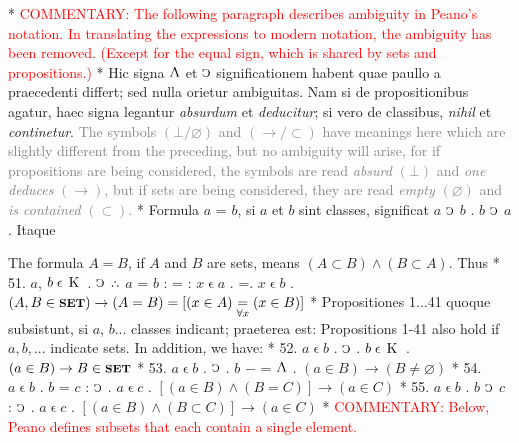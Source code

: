 \documentclass{book}
\newcommand{\C}{\mathop{\sbox0{$\displaystyle$$\reflectbox{C}$} %
\raisebox{-\height+\ht0-0.05cm}[\ht0][\dp0]{\scalebox{0.8}[0.8]{\copy0}}}\displaylimits} %
\newcommand{\pppNoSpace}{\leavevmode\lower0ex\hbox{.}\kern-0.1em\raise0.7ex\hbox{.}\kern-0.1em\lower0ex\hbox{.}} %
\newcommand{\abs}{\mathop{\rotatebox[origin=c]{180}{V}}}
\newcommand{\smallIn}{\ensuremath{\mathrel{\epsilon}}}
\newcommand{\K}{\mathop{\thinspace \text{K} \thinspace}}
\newcommand{\setOfSets}{\mathord{\text{{\footnotesize \textbf{SET}}}}}
\newcommand\irrelavent[1]{\textcolor{gray}{#1}}
\newcommand\commentary[1]{\textcolor{red}{COMMENTARY: #1}}
\newenvironment{translateTwoCol}
               { %
                 \columnratio{0.5, 0.5}
                 \begin{paracol}{2}
                 \newcommand{\LAT}{\switchcolumn[0]*}
                 \newcommand{\ENG}{\switchcolumn[1]}
               }
               { %
                 \let\ENG\undefined
                 \let\LAT\undefined
                 \end{paracol}
               }
\begin{document}
\begin{translateTwoCol}
\LAT
\ENG
\commentary{The following paragraph describes ambiguity in Peano's notation.  In translating the expressions to modern notation, the ambiguity has been removed.  (Except for the equal sign, which is shared by sets and propositions.) }
\LAT
Hic signa $\abs$ et $\C$ significationem habent quae paullo a praecedenti differt; sed nulla orietur ambiguitas. Nam si de propositionibus agatur, haec signa legantur \emph{absurdum} et \emph{deducitur}; si vero de classibus, \emph{nihil} et \emph{continetur}.
\ENG
\irrelavent{The symbols $(\bot / \varnothing)$ and $(\rightarrow / \subset)$ have meanings here which are slightly different from the preceding, but no ambiguity will arise, for if propositions are being considered, the symbols are read \emph{absurd} $(\bot)$ and \emph{one deduces} $(\rightarrow)$, but if sets are being considered, they are read \emph{empty} $(\varnothing)$ and \emph{is contained} $(\subset)$.}
\LAT
\quad Formula $a$ = $b$, si $a$ et $b$ sint classes, significat $a$ $\C$ $b$ . $b$ $\C$ $a$. Itaque
\ENG
\raggedright
\quad The formula $A = B$, if $A$ and $B$ are sets, means $(A \subset B) \wedge (B \subset A)$. Thus
\LAT
51. \hspace{0.67cm} $a$, $b \smallIn \K$ . $\C$ $\pppNoSpace$ $a$ = $b$ : = : $x \smallIn a$ . =\scalebox{0.7}{$x$}\thinspace . $x \smallIn b$
\ENG
51. \hspace{0.67cm} $(A, B \in \setOfSets) \rightarrow (A = B) = [(x \in A) \underset{\forall x}=  (x \in B)]$
\LAT
Propositiones 1...41 quoque subsistunt, si $a$, $b$... classes indicant; praeterea est:
\ENG
Propositions 1-41 also hold if $a,b,...$ indicate sets. In addition, we have:
\LAT
52. \hspace{0.67cm} $a\smallIn b$ . $\C$ . $b \smallIn \K$
\ENG
52. \hspace{0.67cm} $(a \in B) \rightarrow B \in \setOfSets$
\LAT
53. \hspace{0.67cm} $a\smallIn b$ . $\C$ . $b$ $-$ = $\abs$
\ENG
53. \hspace{0.67cm} $(a \in B) \rightarrow (B \not= \varnothing)$
\LAT
54. \hspace{0.67cm} $a \smallIn b$ . $b$ = $c$ : $\C$ . $a \smallIn c$
\ENG
54. \hspace{0.67cm} $[(a \in B) \wedge (B = C)] \rightarrow (a \in C)$
\LAT
55. \hspace{0.67cm} $a \smallIn b$ . $b$ $\C$ $c$ : $\C$ . $a \smallIn c$
\ENG
55. \hspace{0.67cm} $[(a \in B) \wedge (B \subset C)] \rightarrow (a \in C)$
\LAT
\ENG
\commentary{Below, Peano defines subsets that each contain a single element.}

\end{translateTwoCol}
\end{document}
